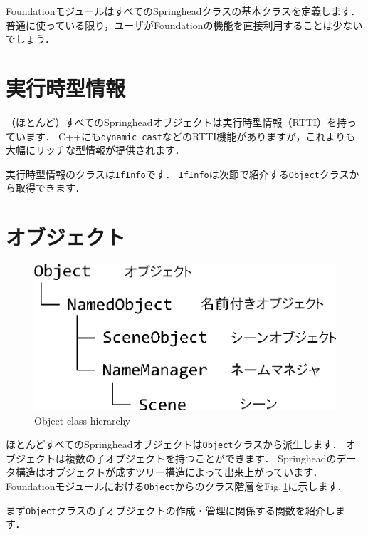 FoundationモジュールはすべてのSpringheadクラスの基本クラスを定義します．
\KLUDGE 普通に使っている限り，ユーザがFoundationの機能を直接利用することは少ないでしょう．

\section{実行時型情報}

\KLUDGE （ほとんど）すべてのSpringheadオブジェクトは実行時型情報（RTTI）を持っています．
C++にも\texttt{dynamic\_cast}などのRTTI機能がありますが，これよりも大幅にリッチな型情報が提供されます．

\KLUDGE 実行時型情報のクラスは\texttt{IfInfo}です．
\texttt{IfInfo}は次節で紹介する\texttt{Object}クラスから取得できます．

\section{オブジェクト}

\begin{figure}[t]
\begin{center}
\includegraphics[width=.5\hsize]{fig/utclass.eps}
\end{center}
\caption{Object class hierarchy}
\label{fig_utclass}
\end{figure}

\KLUDGE ほとんどすべてのSpringheadオブジェクトは\texttt{Object}クラスから派生します．
\KLUDGE オブジェクトは複数の子オブジェクトを持つことができます．
Springheadのデータ構造はオブジェクトが成すツリー構造によって出来上がっています．
Foundationモジュールにおける\texttt{Object}からのクラス階層をFig.\,\ref{fig_utclass}に示します．

\KLUDGE まず\texttt{Object}クラスの子オブジェクトの作成・管理に関係する関数を紹介します．

